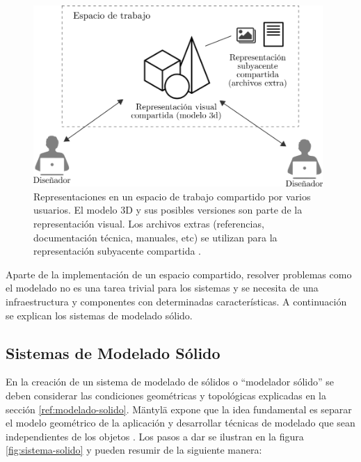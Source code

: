 \begin{figure}[ht]
\includegraphics[width=11cm]{Img/CPD/cad-shared.png}
\centering
\caption{\footnotesize{Representaciones en un espacio de trabajo compartido por varios usuarios. El modelo 3D y sus posibles versiones son parte de la representación visual. Los archivos extras (referencias, documentación técnica, manuales, etc) se utilizan para la representación subyacente compartida  \citep{Maher2006}.}}
\label{fig:sistemashared}
\end{figure}

Aparte de la implementación de un espacio compartido, resolver problemas como el modelado no es una tarea trivial para los sistemas y se necesita de una infraestructura y componentes con determinadas características. A continuación se explican los sistemas de modelado sólido.

\subsection{Sistemas de Modelado Sólido }

En la creación de un sistema de modelado de sólidos o ``modelador sólido'' se deben considerar las condiciones geométricas y topológicas explicadas en la sección \ref{ref:modelado-solido}. Mäntylä expone que la idea fundamental es separar el modelo geométrico de la aplicación y desarrollar técnicas de modelado que sean independientes de los objetos \citep{Mantyla:1988:ISM:60949}. Los pasos a dar se ilustran en la figura \ref{fig:sistema-solido} y pueden resumir de la siguiente manera:


